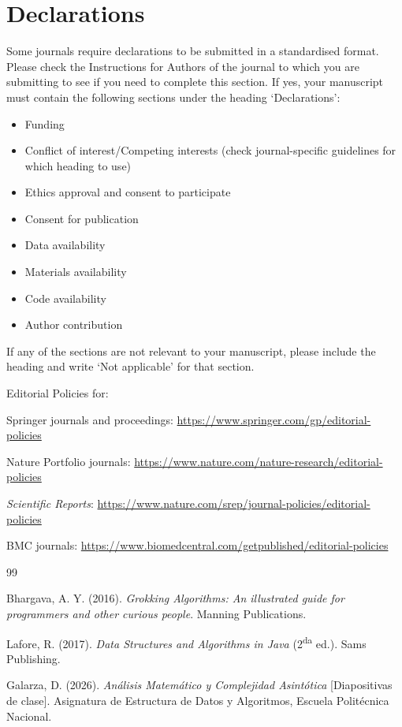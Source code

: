\documentclass[pdflatex,sn-mathphys-num]{sn-jnl}%
\theoremstyle{thmstyleone}%
\theoremstyle{thmstyletwo}%
\theoremstyle{thmstylethree}%
\begin{document}
\section*{Declarations}

Some journals require declarations to be submitted in a standardised format. Please check the Instructions for Authors of the journal to which you are submitting to see if you need to complete this section. If yes, your manuscript must contain the following sections under the heading `Declarations':

\begin{itemize}
\item Funding
\item Conflict of interest/Competing interests (check journal-specific guidelines for which heading to use)
\item Ethics approval and consent to participate
\item Consent for publication
\item Data availability 
\item Materials availability
\item Code availability 
\item Author contribution
\end{itemize}

\noindent
If any of the sections are not relevant to your manuscript, please include the heading and write `Not applicable' for that section. 

\bigskip
\begin{flushleft}%
Editorial Policies for:

\bigskip\noindent
Springer journals and proceedings: \url{https://www.springer.com/gp/editorial-policies}

\bigskip\noindent
Nature Portfolio journals: \url{https://www.nature.com/nature-research/editorial-policies}

\bigskip\noindent
\textit{Scientific Reports}: \url{https://www.nature.com/srep/journal-policies/editorial-policies}

\bigskip\noindent
BMC journals: \url{https://www.biomedcentral.com/getpublished/editorial-policies}
\end{flushleft}


\begin{thebibliography}{99}

Bhargava, A. Y. (2016). \textit{Grokking Algorithms: An illustrated guide for programmers and other curious people}. Manning Publications.

Lafore, R. (2017). \textit{Data Structures and Algorithms in Java} (2\textsuperscript{da} ed.). Sams Publishing.

Galarza, D. (2026). \textit{Análisis Matemático y Complejidad Asintótica} [Diapositivas de clase]. Asignatura de Estructura de Datos y Algoritmos, Escuela Politécnica Nacional.

\end{thebibliography}
\end{document}
